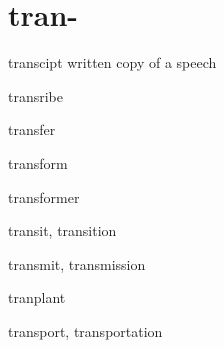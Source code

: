 \chapter{tran-}

\begin{word}{transcipt}
    written copy of a speech
\end{word}

\begin{word}{transribe}
\end{word}

\begin{word}{transfer}
\end{word}

\begin{word}{transform}
\end{word}

\begin{word}{transformer}
\end{word}

\begin{word}{transit, transition}
\end{word}

\begin{word}{transmit, transmission}
\end{word}

\begin{word}{tranplant}
\end{word}

\begin{word}{transport, transportation}
\end{word}



